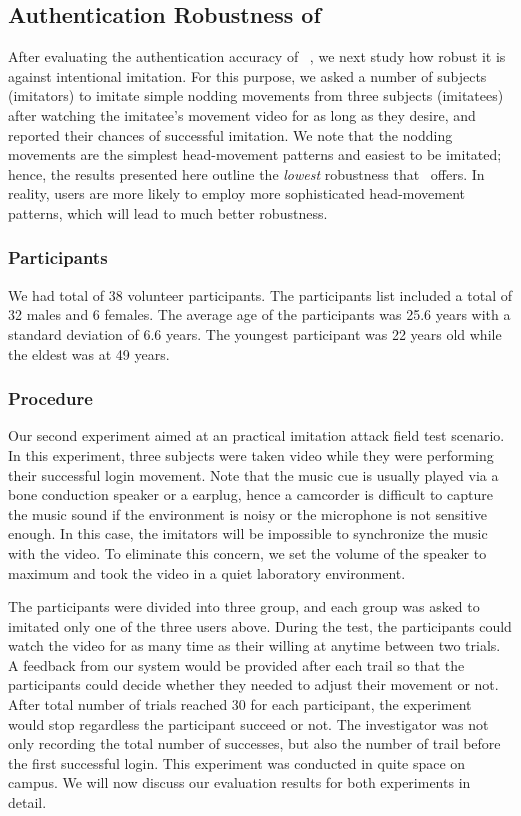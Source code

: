 
\subsection{Authentication Robustness of \systemname} After evaluating the authentication accuracy of \systemname~, we next study how robust it is against intentional imitation. For this purpose, we asked a number of subjects (imitators) to imitate simple nodding movements from three subjects (imitatees) after watching the imitatee's movement video for as long as they desire, and reported their chances of successful imitation. We note that the nodding movements are the simplest head-movement patterns and easiest to be imitated; hence, the results presented here outline the \emph{lowest} robustness that \systemname~offers. In reality, users are more likely to employ more sophisticated head-movement patterns, which will lead to much better robustness.

\subsubsection{Participants}
We had total of 38 volunteer participants. The participants list included a total of 32 males and 6 females.
The average age of the participants was 25.6 years with a standard deviation
of 6.6 years. The youngest participant was 22 years old while the eldest was
at 49 years.
\subsubsection{Procedure}
Our second experiment aimed at an practical imitation attack field test scenario. In this experiment, three subjects were taken video while they were performing their successful login movement. Note that the music cue is usually played via a bone conduction speaker or a earplug, hence a camcorder is difficult to capture the music sound if the environment is noisy or the microphone is not sensitive enough. In this case, the imitators will be impossible to synchronize the music with the video. To eliminate this concern, we set the volume of the speaker to maximum and took the video in a quiet laboratory environment.

The participants were divided into three group, and each group was asked to imitated only one of the three users above. During the test, the participants could watch the video for as many time as their willing at anytime between two trials. A feedback from our system would be provided after each trail so that the participants could decide whether they needed to adjust their movement or not. After total number of trials reached 30 for each participant, the experiment would stop regardless the participant succeed or not. The investigator was not only recording the total number of successes, but also the number of trail before the first successful login. This experiment was conducted in quite space on campus. We will now discuss our evaluation results for both experiments in detail.

